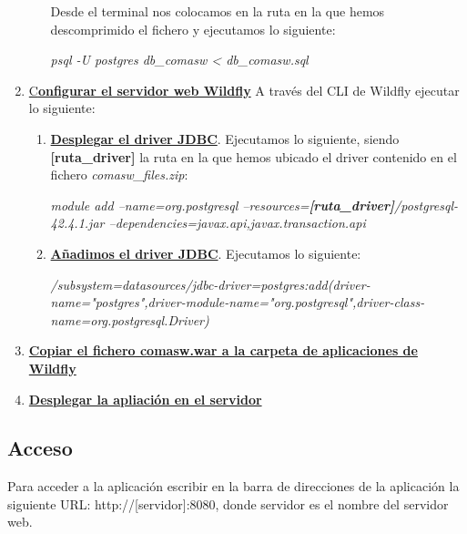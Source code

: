 \begin{enumerate}
\begin{enumerate}
Desde el terminal nos colocamos en la ruta en la que hemos descomprimido el fichero y ejecutamos lo siguiente:\newline

\emph{psql -U postgres db\_comasw < db\_comasw.sql} \newline

	\end{enumerate}
\item \underline{C\textbf{onfigurar el servidor web Wildfly}}\newline
A través del CLI de Wildfly ejecutar lo siguiente:

	\begin{enumerate}
	\item  \underline{\textbf{Desplegar el driver JDBC}}.\newline
Ejecutamos lo siguiente, siendo \textbf{[ruta\_driver]} la ruta en la que hemos ubicado el driver contenido en el fichero \emph{comasw\_files.zip}:

\emph{module add --name=org.postgresql --resources=\textbf{[ruta\_driver]}/postgresql-42.4.1.jar --dependencies=javax.api,javax.transaction.api}
\newline

	\item \underline{\textbf{Añadimos el driver JDBC}}.\newline
Ejecutamos lo siguiente:\newline

\emph{/subsystem=datasources/jdbc-driver=postgres:add(driver-name="postgres",driver-module-name="org.postgresql",driver-class-name=org.postgresql.Driver)}
\newline
	\end{enumerate}

\item \underline{\textbf{Copiar el fichero comasw.war a la carpeta de aplicaciones de Wildfly}}
\item \underline{\textbf{Desplegar la apliación en el servidor}}
\end{enumerate}


 
\subsection{Acceso}
\label{sub:acceso-administrador}
 
Para acceder a la aplicación escribir en la barra de direcciones de la aplicación la
siguiente URL: http://[servidor]:8080, donde servidor es el nombre del servidor web.

